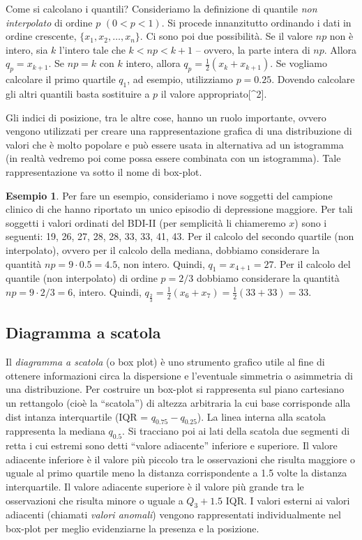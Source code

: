 \documentclass[
  10pt,
  italian,
  a4paper,
  extrafontsizes,onecolumn,openright
  ]{memoir}
\theoremstyle{definition}
\theoremstyle{definition}
\newtheorem{example}{Esempio}[chapter]
\theoremstyle{definition}
\theoremstyle{definition}
\theoremstyle{remark}
\begin{document}
Come si calcolano i quantili? Consideriamo la definizione di quantile
\emph{non interpolato} di ordine \(p\) \((0 < p < 1)\). Si procede innanzitutto
ordinando i dati in ordine crescente, \(\{x_1, x_2, \dots, x_n\}\). Ci
sono poi due possibilità. Se il valore \(np\) non è intero, sia \(k\)
l'intero tale che \(k < np < k + 1\) -- ovvero, la parte intera di \(np\).
Allora \(q_p = x_{k+1}.\) Se \(np = k\) con \(k\) intero, allora
\(q_p = \frac{1}{2}(x_{k} + x_{k+1}).\) Se vogliamo calcolare il primo
quartile \(q_1\), ad esempio, utilizziamo \(p = 0.25\). Dovendo calcolare
gli altri quantili basta sostituire a \(p\) il valore appropriato{[}\^{}2{]}.

Gli indici di posizione, tra le altre cose, hanno un ruolo importante,
ovvero vengono utilizzati per creare una rappresentazione grafica di una
distribuzione di valori che è molto popolare e può essere usata in
alternativa ad un istogramma (in realtà vedremo poi come possa essere
combinata con un istogramma). Tale rappresentazione va sotto il nome di
box-plot.

\begin{example}
Per fare un esempio, consideriamo i nove soggetti del campione clinico di \textcite{zetschefuture2019} che hanno riportato un unico episodio di depressione maggiore. Per tali soggetti i valori ordinati del BDI-II (per semplicità li chiameremo \(x\)) sono i seguenti: 19, 26, 27, 28, 28, 33, 33, 41, 43.
Per il calcolo del secondo quartile (non interpolato), ovvero per il calcolo della mediana, dobbiamo considerare la quantità \(np = 9 \cdot 0.5 = 4.5\), non intero. Quindi, \(q_1 = x_{4 + 1} = 27\).
Per il calcolo del quantile (non interpolato) di ordine \(p = 2/3\) dobbiamo considerare la quantità \(np = 9 \cdot 2/3 = 6\), intero. Quindi, \(q_{\frac{2}{3}} = \frac{1}{2} (x_{6} + x_{7}) = \frac{1}{2} (33 + 33) = 33\).
\end{example}

\hypertarget{diagramma-a-scatola}{%
\subsection{Diagramma a scatola}\label{diagramma-a-scatola}}

Il \emph{diagramma a scatola} (o box plot) è uno strumento grafico utile al
fine di ottenere informazioni circa la dispersione e l'eventuale
simmetria o asimmetria di una distribuzione. Per costruire un box-plot
si rappresenta sul piano cartesiano un rettangolo (cioè la ``scatola'') di
altezza arbitraria la cui base corrisponde alla dist intanza
interquartile (IQR = \(q_{0.75} - q_{0.25}\)). La linea interna alla
scatola rappresenta la mediana \(q_{0.5}\). Si tracciano poi ai lati della
scatola due segmenti di retta i cui estremi sono detti ``valore
adiacente'' inferiore e superiore. Il valore adiacente inferiore è il
valore più piccolo tra le osservazioni che risulta maggiore o uguale al
primo quartile meno la distanza corrispondente a 1.5 volte la distanza
interquartile.
Il valore adiacente superiore è il valore più grande tra le osservazioni che risulta minore o uguale a \(Q_3+1.5\) IQR. I valori esterni ai valori adiacenti (chiamati \emph{valori anomali}) vengono rappresentati individualmente nel box-plot per meglio evidenziarne la presenza e la posizione.
\end{document}
